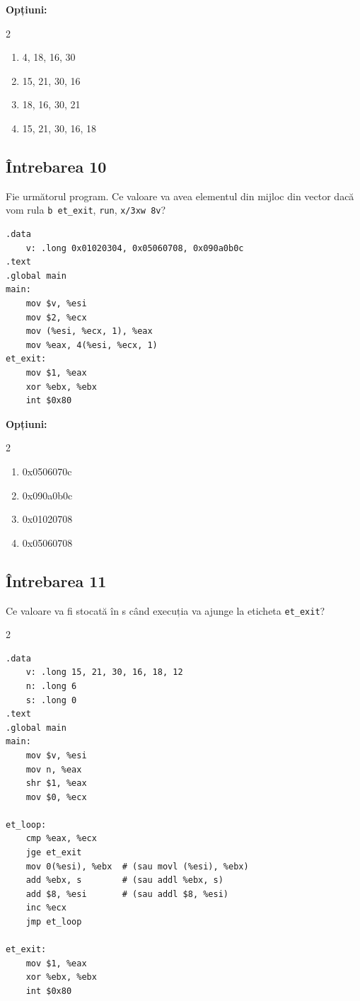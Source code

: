 \documentclass[12pt,a4paper]{article}
\begin{document}
\textbf{Opțiuni:}
\begin{multicols}{2}
\begin{enumerate}[label=\alph*)]
    \item 4, 18, 16, 30 
    \item 15, 21, 30, 16
    \item 18, 16, 30, 21
    \item 15, 21, 30, 16, 18
\end{enumerate}
\end{multicols}

\subsection*{Întrebarea 10}
Fie următorul program. Ce valoare va avea elementul din mijloc din vector dacă vom rula \texttt{b et\_exit}, \texttt{run}, \texttt{x/3xw 8v}?
\begin{lstlisting}[language=x86asm]
.data
    v: .long 0x01020304, 0x05060708, 0x090a0b0c
.text
.global main
main:
    mov $v, %esi
    mov $2, %ecx
    mov (%esi, %ecx, 1), %eax
    mov %eax, 4(%esi, %ecx, 1)
et_exit:
    mov $1, %eax
    xor %ebx, %ebx
    int $0x80
\end{lstlisting}

\textbf{Opțiuni:}
\begin{multicols}{2}
\begin{enumerate}[label=\alph*)]
    \item 0x0506070c
    \item 0x090a0b0c
    \item 0x01020708 
    \item 0x05060708
\end{enumerate}
\end{multicols}
\newpage

\subsection*{Întrebarea 11}
Ce valoare va fi stocată în s când execuția va ajunge la eticheta \texttt{et\_exit}?
\begin{multicols}{2}
\begin{lstlisting}[language=x86asm]
.data
    v: .long 15, 21, 30, 16, 18, 12
    n: .long 6
    s: .long 0
.text
.global main
main:
    mov $v, %esi
    mov n, %eax
    shr $1, %eax
    mov $0, %ecx

et_loop:
    cmp %eax, %ecx
    jge et_exit
    mov 0(%esi), %ebx  # (sau movl (%esi), %ebx)
    add %ebx, s        # (sau addl %ebx, s)
    add $8, %esi       # (sau addl $8, %esi)
    inc %ecx
    jmp et_loop

et_exit:
    mov $1, %eax
    xor %ebx, %ebx
    int $0x80
\end{lstlisting}
\end{multicols}
\end{document}
